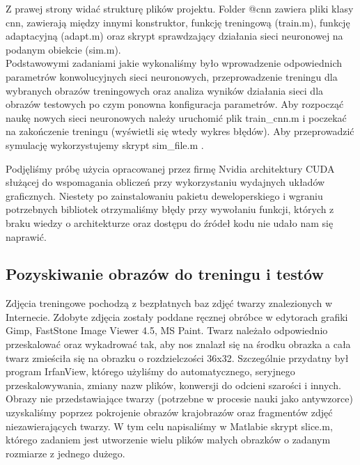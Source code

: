\documentclass[11pt,a4paper]{article}
\begin{document}
Z prawej strony widać strukturę plików projektu. Folder @cnn zawiera pliki klasy cnn, zawierają między innymi konstruktor, funkcję treningową (train.m), funkcję adaptacyjną (adapt.m) oraz skrypt sprawdzający działania sieci neuronowej na podanym obiekcie (sim.m).\\
\indent
 Podstawowymi zadaniami jakie wykonaliśmy było wprowadzenie odpowiednich parametrów konwolucyjnych sieci neuronowych, przeprowadzenie treningu dla wybranych obrazów treningowych oraz analiza wyników działania sieci dla obrazów testowych po czym ponowna konfiguracja parametrów.
Aby rozpocząć naukę nowych sieci neuronowych należy uruchomić plik train\_cnn.m i poczekać na zakończenie treningu (wyświetli się wtedy wykres błędów). Aby przeprowadzić symulację wykorzystujemy skrypt sim\_file.m .

Podjęliśmy próbę użycia opracowanej przez firmę Nvidia architektury CUDA służącej do wspomagania obliczeń przy wykorzystaniu wydajnych układów graficznych. Niestety po zainstalowaniu pakietu deweloperskiego i wgraniu potrzebnych bibliotek otrzymaliśmy błędy przy wywołaniu funkcji, których z braku wiedzy o architekturze oraz dostępu do źródeł kodu nie udało nam się naprawić.
  

\subsection{Pozyskiwanie obrazów do treningu i testów}
Zdjęcia treningowe pochodzą z bezpłatnych baz zdjęć twarzy znalezionych w Internecie. Zdobyte zdjęcia zostały poddane ręcznej obróbce w edytorach grafiki Gimp, FastStone Image Viewer 4.5, MS Paint. Twarz należało odpowiednio przeskalować oraz wykadrować tak, aby nos znalazł się na środku obrazka a cała twarz zmieściła się na obrazku o rozdzielczości 36x32.  Szczególnie przydatny był program IrfanView, którego użyliśmy do automatycznego, seryjnego przeskalowywania, zmiany nazw plików, konwersji do odcieni szarości i innych.\\
\indent
Obrazy nie przedstawiające twarzy (potrzebne w procesie nauki jako antywzorce) uzyskaliśmy poprzez pokrojenie obrazów krajobrazów oraz fragmentów zdjęć niezawierających twarzy. W tym celu napisaliśmy w Matlabie skrypt slice.m, którego zadaniem jest utworzenie wielu plików małych obrazków o zadanym rozmiarze z jednego dużego.
\end{document}
